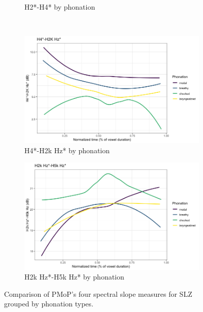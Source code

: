 \documentclass[12pt, letterpaper]{article}
\begin{document}
\begin{figure}
\begin{subfigure}{.5\textwidth}
		\caption{H2*-H4* by phonation}
		\label{fig:H2H4}
	\end{subfigure}%
    \\
    \begin{subfigure}{.5\textwidth}
		\centering
		\includegraphics[width=\linewidth]{Images/h4h2k.png}
		\caption{H4*-H2k Hz* by phonation}
		\label{fig:H4H2k}
	\end{subfigure}%
    \begin{subfigure}{.5\textwidth}
		\centering
		\includegraphics[width=\linewidth]{Images/h2kh5k.png}
		\caption{H2k Hz*-H5k Hz* by phonation}
		\label{fig:H2kH5k}
	\end{subfigure}
    \caption{Comparison of PMoP's four spectral slope measures for SLZ grouped by phonation types. }
	\label{fig:SpectralSlopes}
\end{figure}
\end{document}
